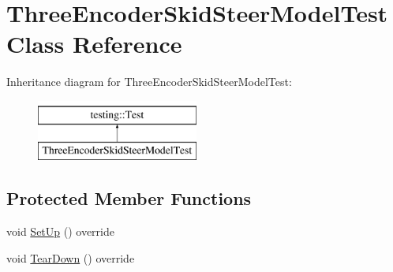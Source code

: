 \hypertarget{classThreeEncoderSkidSteerModelTest}{}\section{Three\+Encoder\+Skid\+Steer\+Model\+Test Class Reference}
\label{classThreeEncoderSkidSteerModelTest}
Inheritance diagram for Three\+Encoder\+Skid\+Steer\+Model\+Test\+:\begin{figure}[H]
\begin{center}
\leavevmode
\includegraphics[height=2.000000cm]{classThreeEncoderSkidSteerModelTest}
\end{center}
\end{figure}
\subsection*{Protected Member Functions}
\begin{DoxyCompactItemize}
\item 
void \mbox{\hyperlink{classThreeEncoderSkidSteerModelTest_a1f737d5acfc0a34821a47d3ea5498fc1}{Set\+Up}} () override
\item 
void \mbox{\hyperlink{classThreeEncoderSkidSteerModelTest_ac26aaffa411b90fde9ff31c77cba5bfd}{Tear\+Down}} () override
\end{DoxyCompactItemize}
